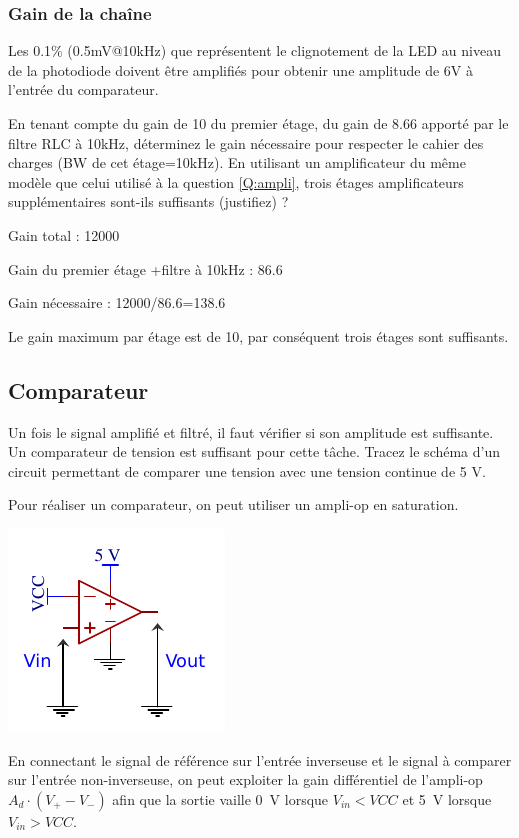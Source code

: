 \documentclass{../template/tp}
\begin{document}
 \subsubsection{Gain de la chaîne}

 Les 0.1\% (0.5mV@10kHz) que représentent le clignotement de la LED au niveau de la photodiode doivent être amplifiés pour obtenir une amplitude de 6V à l'entrée du comparateur.

 \Question
 {
 En tenant compte du gain de 10 du premier étage, du gain de 8.66 apporté par le filtre RLC à 10kHz, déterminez le gain nécessaire pour respecter le cahier des charges (BW de cet étage=10kHz). En utilisant un amplificateur du même modèle que celui utilisé à la question \ref{Q:ampli}, trois étages amplificateurs supplémentaires sont-ils suffisants (justifiez) ?

 }
 {%
 Gain total : 12000

 Gain du premier étage +filtre à 10kHz : 86.6

 Gain nécessaire : 12000/86.6=138.6

 Le gain maximum par étage est de 10, par conséquent trois étages sont suffisants.
 }

\subsection{Comparateur}
Un fois le signal amplifié et filtré, il faut vérifier si son amplitude est suffisante. Un comparateur de tension est suffisant pour cette tâche.
\Question
{
Tracez le schéma d'un circuit permettant de comparer une tension avec une tension continue de 5 V.
}
{%
Pour réaliser un comparateur, on peut utiliser un ampli-op en saturation.

\begin{center}
	\includegraphics[scale=1.4]{comparateur.pdf}
\end{center}

En connectant le signal de référence sur l'entrée inverseuse et le signal à comparer sur l'entrée non-inverseuse, on peut exploiter la gain différentiel de l'ampli-op $A_d \cdot (V_+ - V_-)$ afin que la sortie vaille 0~V lorsque $V_{in} < VCC$ et 5~V lorsque $V_{in} > VCC$.
}
%
\end{document}
